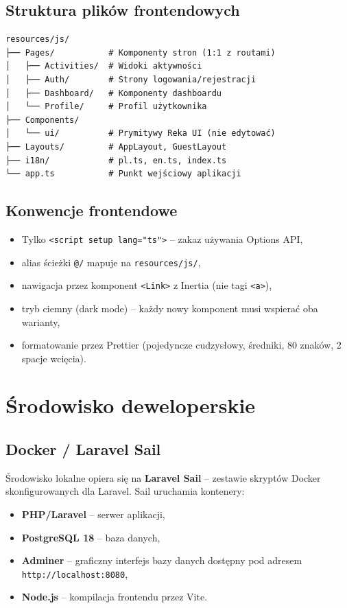 \documentclass[12pt,a4paper]{report}
\begin{document}
\subsection{Struktura plików frontendowych}

\begin{lstlisting}[caption=Struktura katalogu resources/js/]
resources/js/
├── Pages/           # Komponenty stron (1:1 z routami)
│   ├── Activities/  # Widoki aktywności
│   ├── Auth/        # Strony logowania/rejestracji
│   ├── Dashboard/   # Komponenty dashboardu
│   └── Profile/     # Profil użytkownika
├── Components/
│   └── ui/          # Prymitywy Reka UI (nie edytować)
├── Layouts/         # AppLayout, GuestLayout
├── i18n/            # pl.ts, en.ts, index.ts
└── app.ts           # Punkt wejściowy aplikacji
\end{lstlisting}

\subsection{Konwencje frontendowe}

\begin{itemize}[noitemsep]
    \item Tylko \texttt{<script setup lang="ts">} -- zakaz używania Options API,
    \item alias ścieżki \texttt{@/} mapuje na \texttt{resources/js/},
    \item nawigacja przez komponent \texttt{<Link>} z Inertia (nie tagi \texttt{<a>}),
    \item tryb ciemny (dark mode) -- każdy nowy komponent musi wspierać oba warianty,
    \item formatowanie przez Prettier (pojedyncze cudzysłowy, średniki, 80 znaków, 2 spacje wcięcia).
\end{itemize}

\section{Środowisko deweloperskie}

\subsection{Docker / Laravel Sail}

Środowisko lokalne opiera się na \textbf{Laravel Sail} -- zestawie skryptów Docker skonfigurowanych dla Laravel. Sail uruchamia kontenery:
\begin{itemize}[noitemsep]
    \item \textbf{PHP/Laravel} -- serwer aplikacji,
    \item \textbf{PostgreSQL 18} -- baza danych,
    \item \textbf{Adminer} -- graficzny interfejs bazy danych dostępny pod adresem \texttt{http://localhost:8080},
    \item \textbf{Node.js} -- kompilacja frontendu przez Vite.
\end{itemize}
\end{document}
